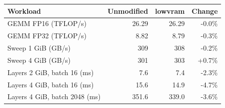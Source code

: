 \begin{tabular}{lrrr}
\toprule
Workload & Unmodified & lowvram & Change \\
\midrule
GEMM FP16 (TFLOP/s) & 26.29 & 26.29 & -0.0\% \\
GEMM FP32 (TFLOP/s) & 8.82 & 8.79 & -0.3\% \\
Sweep 1 GiB (GB/s) & 309 & 308 & -0.2\% \\
Sweep 4 GiB (GB/s) & 301 & 303 & +0.7\% \\
Layers 2 GiB, batch 16 (ms) & 7.6 & 7.4 & -2.3\% \\
Layers 4 GiB, batch 16 (ms) & 15.6 & 14.9 & -4.7\% \\
Layers 4 GiB, batch 2048 (ms) & 351.6 & 339.0 & -3.6\% \\
\bottomrule
\end{tabular}
